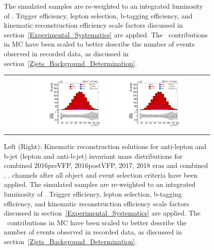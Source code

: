 \begin{figure}[htb]
\begin{center}
{        The simulated samples are re-weighted to an integrated luminosity of \lumivalueRuniiUL.
        Trigger efficiency, lepton selection, b-tagging efficiency, and kinematic reconstruction efficiency scale factors discussed in section~\ref{Experimental_Systematics} are applied.
        The \zjets\ contributions in MC have been scaled to better describe the number of events observed in recorded data, as discussed in section~\ref{Zjets_Background_Determination}.
        }
    \end{center}
\end{figure}

\begin{figure}[htb]
    \begin{center}
        \begin{tabular}{cc}
            \includegraphics[width=0.40\textwidth]{fig_fullRun2UL/controlplots/combined/HypAntiLeptonBjetMass.pdf}
            \includegraphics[width=0.40\textwidth]{fig_fullRun2UL/controlplots/combined/HypLeptonBjetMass.pdf}
        \end{tabular}
        \caption{\footnotesize Left (Right): Kinematic reconstruction solutions for anti-lepton and b-jet (lepton and anti-b-jet) invariant mass distributions for combined 2016preVFP, 2016postVFP, 2017, 2018 eras and combined \ee, \emu, \mumu channels after all object and event selection criteria have been applied.
        The simulated samples are re-weighted to an integrated luminosity of \lumivalueRuniiUL.
        Trigger efficiency, lepton selection, b-tagging efficiency, and kinematic reconstruction efficiency scale factors discussed in section~\ref{Experimental_Systematics} are applied.
        The \zjets\ contributions in MC have been scaled to better describe the number of events observed in recorded data, as discussed in section~\ref{Zjets_Background_Determination}.
        }
    \end{center}
\end{figure}

